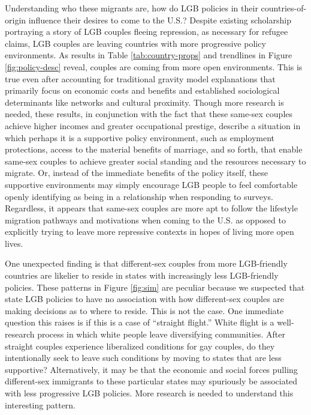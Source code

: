 \documentclass[
  11pt,
]{article}
\begin{document}
Understanding who these migrants are, how do LGB policies in their countries-of-origin influence their desires to come to the U.S.? Despite existing scholarship portraying a story of LGB couples fleeing repression, as necessary for refugee claims, LGB couples are leaving countries with more progressive policy environments. As results in Table \ref{tab:country-props} and trendlines in Figure \ref{fig:policy-desc} reveal, couples are coming from more open environments. This is true even after accounting for traditional gravity model explanations that primarily focus on economic costs and benefits and established sociological determinants like networks and cultural proximity. Though more research is needed, these results, in conjunction with the fact that these same-sex couples achieve higher incomes and greater occupational prestige, describe a situation in which perhaps it is a supportive policy environment, such as employment protections, access to the material benefits of marriage, and so forth, that enable same-sex couples to achieve greater social standing and the resources necessary to migrate. Or, instead of the immediate benefits of the policy itself, these supportive environments may simply encourage LGB people to feel comfortable openly identifying as being in a relationship when responding to surveys. Regardless, it appears that same-sex couples are more apt to follow the lifestyle migration pathways and motivations when coming to the U.S. as opposed to explicitly trying to leave more repressive contexts in hopes of living more open lives.

One unexpected finding is that different-sex couples from more LGB-friendly countries are likelier to reside in states with increasingly less LGB-friendly policies. These patterns in Figure \ref{fig:sim} are peculiar because we suspected that state LGB policies to have no association with how different-sex couples are making decisions as to where to reside. This is not the case. One immediate question this raises is if this is a case of ``straight flight.'' White flight is a well-research process in which white people leave diversifying communities. After straight couples experience liberalized conditions for gay couples, do they intentionally seek to leave such conditions by moving to states that are less supportive? Alternatively, it may be that the economic and social forces pulling different-sex immigrants to these particular states may spuriously be associated with less progressive LGB policies. More research is needed to understand this interesting pattern.
\end{document}
